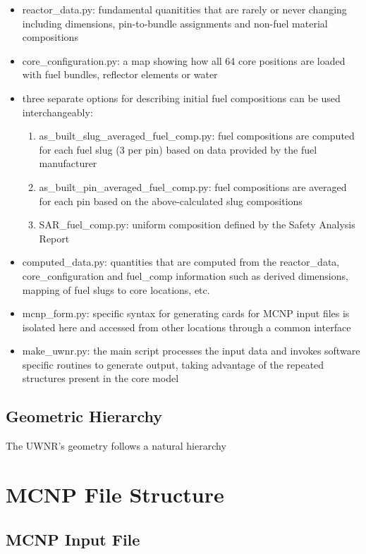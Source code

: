 \documentclass{UWNR_modeling}
\begin{document}
\begin{itemize}
\item reactor\_data.py: fundamental quanitities that are rarely or never
  changing including dimensions, pin-to-bundle assignments and non-fuel
  material compositions
\item core\_configuration.py: a map showing how all 64 core positions are
  loaded with fuel bundles, reflector elements or water
\item three separate options for describing initial fuel compositions can be
  used interchangeably:
  \begin{enumerate}
  \item as\_built\_slug\_averaged\_fuel\_comp.py: fuel compositions are
    computed for each fuel slug (3 per pin) based on data provided by the fuel
    manufacturer
  \item as\_built\_pin\_averaged\_fuel\_comp.py: fuel compositions are
    averaged for each pin based on the above-calculated slug compositions
  \item SAR\_fuel\_comp.py: uniform composition defined by the Safety Analysis
    Report
  \end{enumerate}
\item computed\_data.py: quantities that are computed from the reactor\_data, core\_configuration and fuel\_comp information such as derived dimensions, mapping of fuel slugs to core locations, etc.
\item mcnp\_form.py: specific syntax for generating cards for MCNP input files is isolated here and accessed from other locations through a common interface
\item make\_uwnr.py: the main script processes the input data and invokes software specific routines to generate output, taking advantage of the repeated structures present in the core model
\end{itemize}

\subsection{Geometric Hierarchy}\label{ssection:geom_hier}

The UWNR's geometry follows a natural hierarchy

\section{MCNP File Structure}\label{section:input_struct}

\subsection{MCNP Input File}
\end{document}
